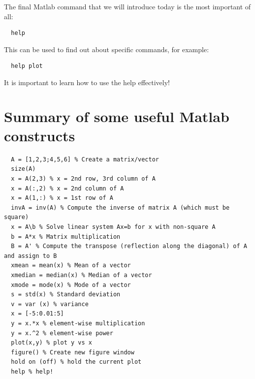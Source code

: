 \documentclass[12pt,a4paper]{tufte-handout}
\begin{document}
The final Matlab command that we will introduce today is the most important of all:
\begin{lstlisting}
  help
\end{lstlisting}
This can be used to find out about specific commands, for example:
\begin{lstlisting}
  help plot
\end{lstlisting}

It is important to learn how to use the help effectively!

\section{Summary of some useful Matlab constructs}

\begin{lstlisting}
  A = [1,2,3;4,5,6] % Create a matrix/vector
  size(A)
  x = A(2,3) % x = 2nd row, 3rd column of A
  x = A(:,2) % x = 2nd column of A
  x = A(1,:) % x = 1st row of A
  invA = inv(A) % Compute the inverse of matrix A (which must be square)
  x = A\b % Solve linear system Ax=b for x with non-square A
  b = A*x % Matrix multiplication
  B = A' % Compute the transpose (reflection along the diagonal) of A and assign to B
  xmean = mean(x) % Mean of a vector
  xmedian = median(x) % Median of a vector
  xmode = mode(x) % Mode of a vector
  s = std(x) % Standard deviation
  v = var (x) % variance
  x = [-5:0.01:5]
  y = x.*x % element-wise multiplication
  y = x.^2 % element-wise power
  plot(x,y) % plot y vs x
  figure() % Create new figure window
  hold on (off) % hold the current plot
  help % help!
\end{lstlisting}
\end{document}
